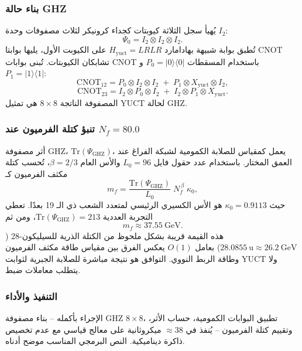 \documentclass[11pt,a4paper]{article}
\begin{document}
	\subsubsection{بناء حالة GHZ}
	
	يُهيأ سجل الثلاثة كيوبتات كجداء كرونيكر لثلاث مصفوفات وحدة \(I_2\):
	\[
	\Psi_0 = I_2 \otimes I_2 \otimes I_2 .
	\]
	تُطبق بوابة شبيهة بهادامارد \(H_{\text{yuct}} = LRLR\) على الكيوبت الأول، يليها بوابتا CNOT تشابكان الكيوبتات. تُبنى بوابات CNOT باستخدام المسقطات \(P_0 = |0\rangle\langle0|\) و \(P_1 = |1\rangle\langle1|\):
	\[
	\mathrm{CNOT}_{12} = P_0 \otimes I_2 \otimes I_2 \;+\; P_1 \otimes X_{\text{yuct}} \otimes I_2 ,
	\]
	\[
	\mathrm{CNOT}_{23} = I_2 \otimes P_0 \otimes I_2 \;+\; I_2 \otimes P_1 \otimes X_{\text{yuct}} .
	\]
	المصفوفة الناتجة \(8\times 8\) هي تمثيل YUCT لحالة GHZ.
	
	\subsubsection{تنبؤ كتلة الفرميون عند \(N_f = 80.0\)}
	
	أثر مصفوفة GHZ، \(\mathrm{Tr}(\Psi_{\mathrm{GHZ}})\)، يعمل كمقياس للصلابة الكمومية لشبكة الفراغ عند العمق المختار. باستخدام عدد حقول فايل \(L_0 = 96\) والأس العام \(\beta = 2/3\)، تُحسب كتلة مكثف الفرميون كـ
	\[
	m_f = \frac{\mathrm{Tr}(\Psi_{\mathrm{GHZ}})}{L_0} \; N_f^{\,\beta} \;
	\kappa_0 ,
	\]
	حيث \(\kappa_0 = 0.9113\) هو الأس الكسيري الرئيسي لمتعدد الشعب ذي الـ 19 بعدًا. تعطي التجربة العددية \(\mathrm{Tr}(\Psi_{\mathrm{GHZ}}) = 213\)، ومن ثم
	\[
	m_f \approx 37.55\ \mathrm{GeV}.
	\]
	هذه القيمة قريبة بشكل ملحوظ من الكتلة الذرية للسيليكون-28 (\(28.0855\ \mathrm{u} \approx 26.2\ \mathrm{GeV}\)) بعامل \(O(1)\) يعكس الفرق بين مقياس طاقة مكثف الفرميون وطاقة الربط النووي. التوافق هو نتيجة مباشرة للصلابة الجبرية لثوابت YUCT ولا يتطلب معاملات ضبط.
	
	\subsubsection{التنفيذ والأداء}
	
	الإجراء بأكمله – بناء مصفوفة GHZ \(8\times 8\)، تطبيق البوابات الكمومية، حساب الأثر، وتقييم كتلة الفرميون – يُنفذ في \(\approx 38\) ميكروثانية على معالج قياسي مع عدم تخصيص ذاكرة ديناميكية. النص البرمجي المناسب موضح أدناه.
	
\end{document}
